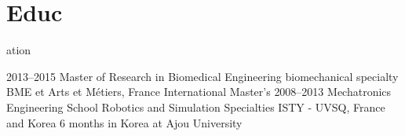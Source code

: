 \documentclass{cv-style}     %
\begin{document}

\section{Educ}{ation}

\begin{entrylist}
\entry
{2013--2015}
{Master of Research in Biomedical Engineering {\normalfont biomechanical specialty}}
{BME et Arts et Métiers, France}
{International Master's}
\entry
{2008--2013}
{Mechatronics Engineering School {\normalfont Robotics and Simulation Specialties}}
{ISTY - UVSQ, France and Korea}
{6 months in Korea at Ajou University}
\end{entrylist}
\end{document}
